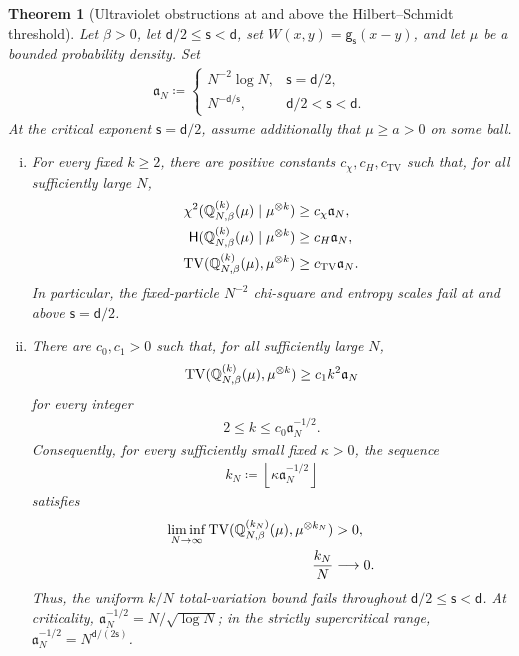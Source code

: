 \documentclass[11pt,reqno]{amsart}
\numberwithin{equation}{section}
\theoremstyle{plain}
\newtheorem{thm}{Theorem}[section]
\theoremstyle{remark}
\DeclarePairedDelimiter{\pa}{\lparen}{\rparen}
\renewcommand{\d}{\mathsf{d}}
\newcommand{\Q}{{\mathbb{Q}}}
\newcommand{\g}{{\mathsf{g}}}
\newcommand{\Hr}{{\mathsf{H}}}
\newcommand{\be}{\beta}
\newcommand{\s}{\mathsf{s}}
\newcommand{\Chi}{\chi^2}
\newcommand{\TV}{\operatorname{TV}}
\begin{document}
\begin{thm}[Ultraviolet obstructions at and above the Hilbert--Schmidt threshold]\label{thm:intro-ultraviolet-sharpness}
Let \(\be>0\), let \(\d/2\le\s<\d\), set \(W(x,y)=\g_\s(x-y)\), and let \(\mu\) be a bounded probability density.  Set
\begin{align}\label{eq:intro-uv-scale}
 \mathfrak a_N
 \coloneqq
 \begin{cases}
  N^{-2}\log N,&\s=\d/2,\\
  N^{-\d/\s},&\d/2<\s<\d.
 \end{cases}
\end{align}
At the critical exponent \(\s=\d/2\), assume additionally that \(\mu\ge a>0\) on some ball.
\begin{enumerate}[(i)]
\item For every fixed \(k\ge2\), there are positive constants \(c_\chi,c_H,c_{\mathrm{TV}}\) such that, for all sufficiently large \(N\),
\begin{subequations}\label{eq:intro-uv-fixed-k-lower}
\begin{align}
 \Chi\pa{\Q_{N,\be}^{(k)}(\mu)\mid\mu^{\otimes k}}
 &\ge c_\chi\mathfrak a_N,\label{eq:intro-uv-fixed-k-chi}\\
 \Hr\pa{\Q_{N,\be}^{(k)}(\mu)\mid\mu^{\otimes k}}
 &\ge c_H\mathfrak a_N,\label{eq:intro-uv-fixed-k-H}\\
 \TV\pa{\Q_{N,\be}^{(k)}(\mu),\mu^{\otimes k}}
 &\ge c_{\mathrm{TV}}\mathfrak a_N.\label{eq:intro-uv-fixed-k-TV}
\end{align}
\end{subequations}
In particular, the fixed-particle \(N^{-2}\) chi-square and entropy scales fail at and above \(\s=\d/2\).

\item There are \(c_0,c_1>0\) such that, for all sufficiently large \(N\),
\begin{align}\label{eq:intro-mesoscopic-TV-lower}
 \TV\pa{\Q_{N,\be}^{(k)}(\mu),\mu^{\otimes k}}
 \ge c_1k^2\mathfrak a_N
\end{align}
for every integer
\begin{align}\label{eq:intro-mesoscopic-k-window}
 2\le k\le c_0\mathfrak a_N^{-1/2}.
\end{align}
Consequently, for every sufficiently small fixed \(\kappa>0\), the sequence
\begin{align}\label{eq:intro-mesoscopic-kN}
 k_N\coloneqq\left\lfloor\kappa\mathfrak a_N^{-1/2}\right\rfloor
\end{align}
satisfies
\begin{align}
 \liminf_{N\to\infty}\TV\pa{\Q_{N,\be}^{(k_N)}(\mu),\mu^{\otimes k_N}}&>0,
 \label{eq:intro-mesoscopic-positive-liminf}\\
 \frac{k_N}{N}&\longrightarrow0.
 \label{eq:intro-mesoscopic-vanishing-fraction}
\end{align}
Thus, the uniform \(k/N\) total-variation bound fails throughout \(\d/2\le\s<\d\).  At criticality, \(\mathfrak a_N^{-1/2}=N/\sqrt{\log N}\); in the strictly supercritical range, \(\mathfrak a_N^{-1/2}=N^{\d/(2\s)}\).
\end{enumerate}
\end{thm}
\end{document}
